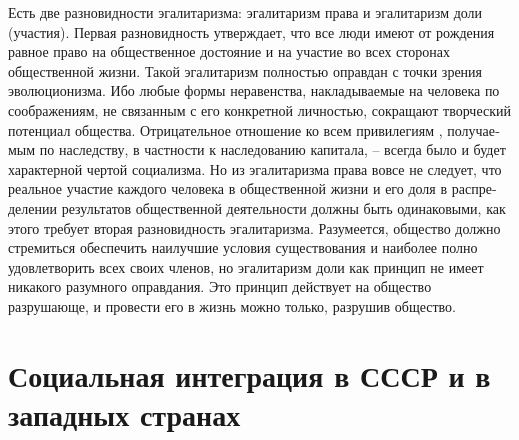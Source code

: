 \documentclass{book}
\begin{document}
Есть две разновидности эгалитаризма: эгалитаризм права и эгалитаризм доли (участия). Первая разновидность утверж­дает, что все люди имеют от рождения равное право на общест­венное достояние и на участие во всех сторонах общественной жизни. Такой эгалитаризм полностью оправдан с точки зрения эволюционизма. Ибо любые формы неравенства, накладывае­мые на человека по соображениям, не связанным с его кон­кретной личностью, сокращают творческий потенциал общест­ва. Отрицательное отношение ко всем привилегиям , получае­мым по наследству, в частности к наследованию капитала, -- всегда было и будет характерной чертой социализма. Но из эгалитаризма права вовсе не следует, что реальное участие каждого человека в общественной жизни и его доля в распре­делении результатов общественной деятельности должны быть одинаковыми, как этого требует вторая разновидность эгали­таризма. Разумеется, общество должно стремиться обеспечить наилучшие условия существования и наиболее полно удов­летворить всех своих членов, но эгалитаризм 
доли как принцип не имеет никакого разумного оправдания. Это принцип дейст­вует на общество разрушающе, и провести его в жизнь можно только, разрушив общество.



\section{Социальная интеграция в СССР и в западных странах}
\end{document}
